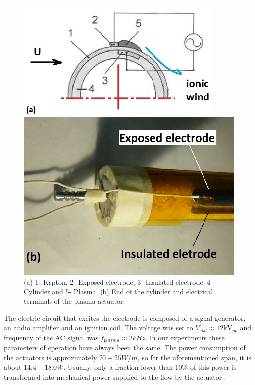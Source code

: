 \documentclass[review]{elsarticle}
\begin{document}
\begin{figure}[h]
\begin{minipage}[c]{\textwidth}
\begin{minipage}[l]{0.475 \textwidth}
\begin{center}
\includegraphics[width = 0.9\textwidth]{Figures/Fig_02_a.jpg}
\end{center}
\end{minipage} \hspace{0.05 \textwidth}
\begin{minipage}[r]{0.475 \textwidth}
\begin{center}
\includegraphics[width = 0.8 \textwidth]{Figures/Fig_02_b}
\end{center}
\end{minipage}
\caption{(a) 1- Kapton, 2- Exposed electrode, 3- Insulated electrode, 4- Cylinder and 5- Plasma. (b) End of the cylinder and electrical terminals of the plasma actuator.}
\label{fig:02}
\end{minipage}
\end{figure}

The electric circuit that excites the electrode is composed of a signal generator, an audio amplifier and an ignition coil. The voltage was set to $V_{ehd} \approx 12 \text{kV}_{pp}$ and frequency of the AC signal was $f_{plasma} \approx 2 kHz$. In our experiments these parameters of operation have always been the same. The power consumption of the actuators is approximately $20-25 W/m$, so for the aforementioned span, it is about $14.4-18.0 W$. Usually, only a fraction lower than $10\%$ of this power is transformed into mechanical power supplied to the flow by the actuator \citep{Moreau2007}.
\end{document}
